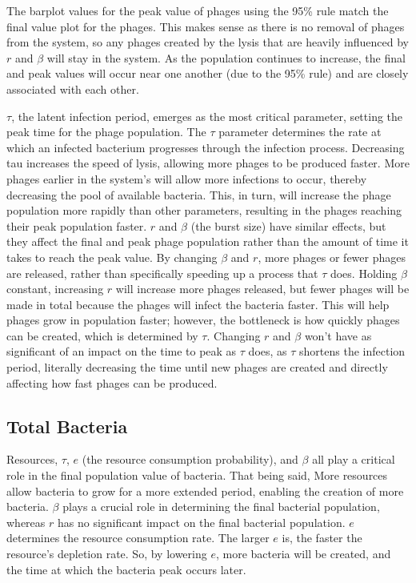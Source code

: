 The barplot values for the peak value of phages using the 95\% rule match the final value plot for the phages. 
This makes sense as there is no removal of phages from the system, so any phages created by the lysis that are heavily influenced by $r$ and $\beta$ will stay in the system. 
As the population continues to increase, the final and peak values will occur near one another (due to the 95\% rule) and are closely associated with each other.

$\tau$, the latent infection period, emerges as the most critical parameter, setting the peak time for the phage population. 
The $\tau$ parameter determines the rate at which an infected bacterium progresses through the infection process. 
Decreasing tau increases the speed of lysis, allowing more phages to be produced faster. 
More phages earlier in the system's will allow more infections to occur, thereby decreasing the pool of available bacteria. 
This, in turn, will increase the phage population more rapidly than other parameters, resulting in the phages reaching their peak population faster.
$r$ and $\beta$ (the burst size) have similar effects, but they affect the final and peak phage population rather than the amount of time it takes to reach the peak value. 
By changing $\beta$ and $r$, more phages or fewer phages are released, rather than specifically speeding up a process that $\tau$ does. 
Holding $\beta$ constant, increasing $r$ will increase more phages released, but fewer phages will be made in total because the phages will infect the bacteria faster. 
This will help phages grow in population faster; however, the bottleneck is how quickly phages can be created, which is determined by $\tau$. 
Changing $r$ and $\beta$ won't have as significant of an impact on the time to peak as $\tau$ does, as $\tau$ shortens the infection period, literally decreasing the time until new phages are created and directly affecting how fast phages can be produced. 

\subsection{Total Bacteria}
Resources, $\tau$, $e$ (the resource consumption probability), and $\beta$ all play a critical role in the final population value of bacteria. 
That being said, 
More resources allow bacteria to grow for a more extended period, enabling the creation of more bacteria. 
$\beta$ plays a crucial role in determining the final bacterial population, whereas $r$ has no significant impact on the final bacterial population. 
$e$ determines the resource consumption rate. 
The larger $e$ is, the faster the resource's depletion rate. 
So, by lowering $e$, more bacteria will be created, and the time at which the bacteria peak occurs later. 

